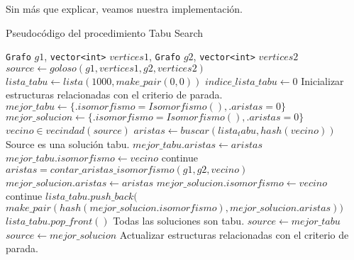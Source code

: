 Sin más que explicar, veamos nuestra implementación.


\begin{algorithm}[H]
  \begin{algorithmic}[1]
  \caption{Pseudocódigo del procedimiento Tabu Search}
  \label{algo:6-1}
              {\texttt{Grafo} $g1$,
               \texttt{vector<int>} $vertices1$,
               \texttt{Grafo} $g2$,
               \texttt{vector<int>} $vertices2$} 
    \State $source \gets goloso(g1, vertices1, g2, vertices2)$
    \State $lista\_tabu \gets lista(1000, make\_pair(0, 0))$
    \State $indice\_lista\_tabu \gets 0$
    \State Inicializar estructuras relacionadas con el criterio de parada.
       \State $mejor\_tabu \gets \{.isomorfismo = Isomorfismo(), .aristas = 0\}$
       \State $mejor\_solucion \gets \{.isomorfismo = Isomorfismo(), .aristas = 0\}$
       \For $vecino \in vecindad(source)$
           \State $aristas \gets buscar(lista_tabu, hash(vecino))$
               \Comment Source es una solución tabu.
                   \State $mejor\_tabu.aristas \gets aristas$
                   \State $mejor\_tabu.isomorfismo \gets vecino$
                   \State continue
               \EndIf
           \Else
               \State $aristas = contar\_aristas\_isomorfismo(g1, g2, vecino)$
                   \State $mejor\_solucion.aristas \gets aristas$
                   \State $mejor\_solucion.isomorfismo \gets vecino$
                   \State continue
               \EndIf
           \EndIf
        \EndFor
            \State $lista\_tabu.push\_back($
            \State \,\,  $make\_pair(
              hash(mejor\_solucion.isomorfismo),
              mejor\_solucion.aristas))$
                 \State $lista\_tabu.pop\_front()$
            \EndIf
        \EndIf
           \Comment Todas las soluciones son tabu.
           \State $source \gets mejor\_tabu$
       \Else
           \State $source \gets mejor\_solucion$
       \EndIf
       \State Actualizar estructuras relacionadas con el criterio de parada.
    \EndWhile
           
		\EndProcedure
	\end{algorithmic}
\end{algorithm}


